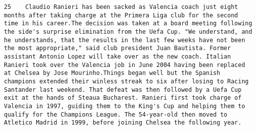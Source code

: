 \documentclass[11pt]{article}
\begin{document}
\begin{Verbatim}[commandchars=\\\{\}]
         25    Claudio Ranieri has been sacked as Valencia coach just eight months after taking charge at the Primera Liga club for the second time in his career.The decision was taken at a board meeting following the side's surprise elimination from the Uefa Cup. "We understand, and he understands, that the results in the last few weeks have not been the most appropriate," said club president Juan Bautista. Former assistant Antonio Lopez will take over as the new coach. Italian Ranieri took over the Valencia job in June 2004 having been replaced at Chelsea by Jose Mourinho.Things began well but the Spanish champions extended their winless streak to six after losing to Racing Santander last weekend. That defeat was then followed by a Uefa Cup exit at the hands of Steaua Bucharest. Ranieri first took charge of Valencia in 1997, guiding them to the King's Cup and helping them to qualify for the Champions League. The 54-year-old then moved to Atletico Madrid in 1999, before joining Chelsea the following year.                                                                                                                                                                                                                                                                                                                                                                                                                                                                                                                                                                                                                                                                                                                                                                                                                                                                                                                                                                                                                                                                                                                                                                                                                                                                                                                                                                                                                                                                                                                                                                                                                                                                                                                                                                                                                                                                                                                                                                                                                                                                                                                                                                                                                                                                                                                                                                     
\end{Verbatim}
\end{document}
